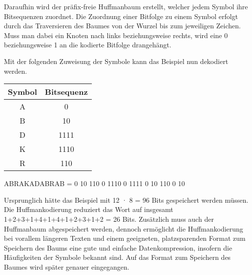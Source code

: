 \documentclass[course=erap]{aspdoc}
\begin{document}
Daraufhin wird der präfix-freie Huffmanbaum erstellt, welcher jedem Symbol ihre Bitsequenzen zuordnet. Die Zuordnung einer Bitfolge zu einem Symbol erfolgt durch das Traversieren %
des Baumes von der Wurzel bis zum jeweiligen Zeichen. Muss man dabei ein Knoten nach links beziehungsweise rechts, wird eine 0 beziehungsweise 1 an die kodierte Bitfolge drangehängt.


\begin{center}
\end{center}


Mit der folgenden Zuweisung der Symbole kann das Beispiel nun dekodiert werden.

\begin{center}
    \begin{tabular}{c|c}
        \textbf{Symbol} & \textbf{Bitsequenz} \\
        \hline
        A & 0 \\
        B & 10\\
        D & 1111\\
        K & 1110\\
        R & 110
    \end{tabular}
    \label{tab:my_label}
\end{center}
\begin{center}
    ABRAKADABRAB = 0 10 110 0 1110 0 1111 0 10 110 0 10
\end{center}

Ursprunglich hätte das Beispiel mit 12 · 8 = 96 Bits gespeichert werden müssen. Die Huffmankodierung reduziert das Wort auf insgesamt 1+2+3+1+4+1+4+1+2+3+1+2 = 26 Bits. Zusätzlich muss auch der Huffmanbaum abgespeichert werden, dennoch ermöglicht die Huffmankodierung bei vorallem längeren Texten und einem geeigneten, platzsparenden Format zum Speichern des Baums eine gute und einfache Datenkompression, insofern die Häufigkeiten der Symbole bekannt sind. Auf das Format zum Speichern des Baumes wird später genauer eingegangen.\cite{4051119}
\end{document}
